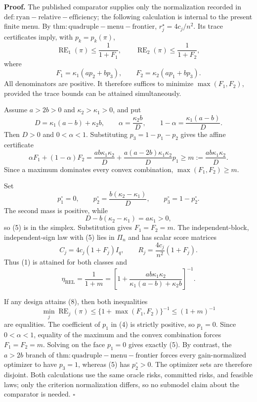 \textbf{Proof.}
The published comparator supplies only the normalization recorded in \(\mathrm{def:ryan-relative-efficiency}\); the following calculation is internal to the present finite menu.  By \(\mathrm{thm:quadruple-menu-frontier}\), \(r_j^\star=4c_j/n^2\).  Its trace certificates imply, with \(p_k=p_k(\pi)\),
\[
\operatorname{RE}_1(\pi)\le\frac1{1+F_1},
\qquad
\operatorname{RE}_2(\pi)\le\frac1{1+F_2}, \tag{1}
\]
where
\[
F_1=\kappa_1(ap_2+bp_3),
\qquad F_2=\kappa_2(ap_1+bp_3). \tag{2}
\]
All denominators are positive.  It therefore suffices to minimize \(\max(F_1,F_2)\), provided the trace bounds can be attained simultaneously.

Assume \(a>2b>0\) and \(\kappa_2>\kappa_1>0\), and put
\[
D=\kappa_1(a-b)+\kappa_2b,
\qquad
\alpha=\frac{\kappa_2b}{D},
\qquad
1-\alpha=\frac{\kappa_1(a-b)}D. \tag{3}
\]
Then \(D>0\) and \(0<\alpha<1\).  Substituting \(p_3=1-p_1-p_2\) gives the affine certificate
\[
\alpha F_1+(1-\alpha)F_2
=\frac{ab\kappa_1\kappa_2}{D}
+\frac{a(a-2b)\kappa_1\kappa_2}{D}p_1
\ge m:=\frac{ab\kappa_1\kappa_2}{D}. \tag{4}
\]
Since a maximum dominates every convex combination, \(\max(F_1,F_2)\ge m\).

Set
\[
p_1^\circ=0,
\qquad
p_2^\circ=\frac{b(\kappa_2-\kappa_1)}D,
\qquad
p_3^\circ=1-p_2^\circ. \tag{5}
\]
The second mass is positive, while
\[
D-b(\kappa_2-\kappa_1)=a\kappa_1>0, \tag{6}
\]
so (5) is in the simplex.  Substitution gives \(F_1=F_2=m\).  The independent-block, independent-sign law with (5) lies in \(\Pi_n\) and has scalar score matrices
\[
C_j=4c_j(1+F_j)I_q,
\qquad
R_j=\frac{4c_j}{n^2}(1+F_j). \tag{7}
\]
Thus (1) is attained for both classes and
\[
\eta_{\mathrm{REL}}
=\frac1{1+m}
=\left[1+\frac{ab\kappa_1\kappa_2}
{\kappa_1(a-b)+\kappa_2b}\right]^{-1}. \tag{8}
\]

If any design attains (8), then both inequalities
\[
\min_j\operatorname{RE}_j(\pi)
\le\{1+\max(F_1,F_2)\}^{-1}
\le(1+m)^{-1} \tag{9}
\]
are equalities.  The coefficient of \(p_1\) in (4) is strictly positive, so \(p_1=0\).  Since \(0<\alpha<1\), equality of the maximum and the convex combination forces \(F_1=F_2=m\).  Solving on the face \(p_1=0\) gives exactly (5).  By contrast, the \(a>2b\) branch of \(\mathrm{thm:quadruple-menu-frontier}\) forces every gain-normalized optimizer to have \(p_3=1\), whereas (5) has \(p_2^\circ>0\).  The optimizer sets are therefore disjoint.  Both calculations use the same oracle risks, committed risks, and feasible laws; only the criterion normalization differs, so no submodel claim about the comparator is needed. \(\square\)